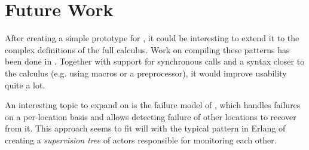 \section{Future Work}

After creating a simple prototype for \corejoincalc,
it could be interesting to extend it to the complex definitions
of the full calculus.
Work on compiling these patterns has been done in \cite{maranget_compiling_1998}.
Together with support for synchronous calls and a syntax closer to the calculus
(e.g. using macros or a preprocessor), it would improve usability quite a lot.

An interesting topic to expand on is the failure model of \distjoincalc
\cite{fournet_calculus_1996}, which handles failures on a per-location basis
and allows detecting failure of other locations to recover from it.
This approach seems to fit will with the typical pattern in Erlang of creating a
\emph{supervision tree} of actors responsible for monitoring each other.
